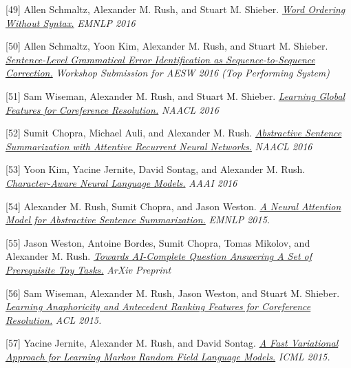 \documentclass[10pt]{article}
\begin{document}
\medskip


[49] \ind Allen Schmaltz, Alexander M. Rush, and Stuart M. Shieber. \emph{\href{ https://arxiv.org/abs/1604.08633 }{ Word Ordering Without Syntax.} }\emph{ EMNLP 2016 }

\medskip


[50] \ind Allen Schmaltz, Yoon Kim, Alexander M. Rush, and Stuart M. Shieber. \emph{\href{ /papers/aesw2016.pdf }{ Sentence-Level Grammatical Error Identification as Sequence-to-Sequence Correction.} }\emph{ Workshop Submission for AESW 2016 (Top Performing System) }

\medskip


[51] \ind Sam Wiseman, Alexander M. Rush, and Stuart M. Shieber. \emph{\href{ /papers/corefmain.pdf }{ Learning Global Features for Coreference Resolution.} }\emph{ NAACL 2016 }

\medskip


[52] \ind Sumit Chopra, Michael Auli, and Alexander M. Rush. \emph{\href{ /papers/naacl16_summary.pdf }{ Abstractive Sentence Summarization with Attentive Recurrent Neural Networks.} }\emph{ NAACL 2016 }

\medskip


[53] \ind Yoon Kim, Yacine Jernite, David Sontag, and Alexander M. Rush. \emph{\href{ https://arxiv.org/pdf/1508.06615v4 }{ Character-Aware Neural Language Models.} }\emph{ AAAI 2016 }

\medskip


[54] \ind Alexander M. Rush, Sumit Chopra, and Jason Weston. \emph{\href{ http://arxiv.org/pdf/1509.00685.pdf }{ A Neural Attention Model for Abstractive Sentence Summarization.} }\emph{ EMNLP 2015. }

\medskip


[55] \ind Jason Weston, Antoine Bordes, Sumit Chopra, Tomas Mikolov, and Alexander M. Rush. \emph{\href{ http://arxiv.org/pdf/1502.05698.pdf }{ Towards AI-Complete Question Answering A Set of Prerequisite Toy Tasks.} }\emph{ ArXiv Preprint }

\medskip


[56] \ind Sam Wiseman, Alexander M. Rush, Jason Weston, and Stuart M. Shieber. \emph{\href{ http://people.seas.harvard.edu/~srush/acl15.pdf }{ Learning Anaphoricity and Antecedent Ranking Features for Coreference Resolution.} }\emph{ ACL 2015. }

\medskip


[57] \ind Yacine Jernite, Alexander M. Rush, and David Sontag. \emph{\href{ http://people.seas.harvard.edu/~srush/icml15.pdf }{ A Fast Variational Approach for Learning Markov Random Field Language Models.} }\emph{ ICML 2015. }
\end{document}
